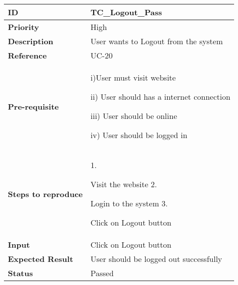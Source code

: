 \begin{center}
    \begin{tabularx}{\textwidth}{|l|X|}
        \hline
        \textbf{ID}                 & TC\_Logout\_Pass                       \\
        \hline
        \textbf{Priority}           & High                                   \\
        \hline
        \textbf{Description}        & User wants to Logout from the system   \\
        \hline
        \textbf{Reference}          & UC-20                                  \\
        \hline
        \textbf{Pre-requisite}      & i)User must visit website

        ii) User should has a internet connection

        iii) User should be online

        iv) User should be logged in                                         \\
        \hline
        \textbf{Steps to reproduce} & 1.

        Visit the website 2.

        Login to the system 3.

        Click on Logout button                                               \\
        \hline
        \textbf{Input}              & Click on Logout button                 \\
        \hline
        \textbf{Expected Result}    & User should be logged out successfully \\
        \hline
        \textbf{Status}             & Passed                                 \\
        \hline
    \end{tabularx}
\end{center}
\vspace{5mm}



